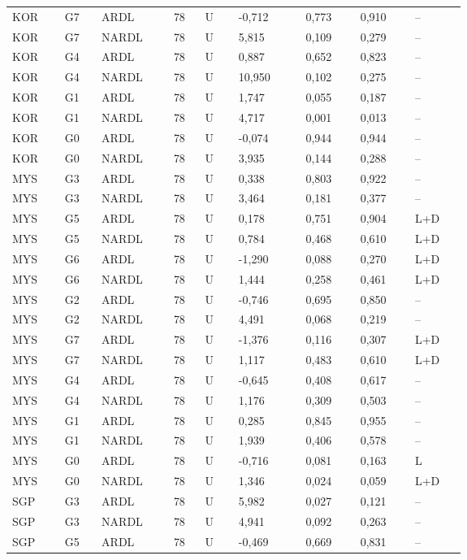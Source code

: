 {\begin{longtable}{p{0.075\linewidth}p{0.05\linewidth}p{0.09\linewidth}p{0.04\linewidth}p{0.05\linewidth}p{0.1\linewidth}p{0.085\linewidth}p{0.085\linewidth}p{0.075\linewidth}}
KOR & G7 & ARDL & 78 & U & -0,712 & 0,773 & 0,910 & --\\
KOR & G7 & NARDL & 78 & U & 5,815 & 0,109 & 0,279 & --\\
KOR & G4 & ARDL & 78 & U & 0,887 & 0,652 & 0,823 & --\\
KOR & G4 & NARDL & 78 & U & 10,950 & 0,102 & 0,275 & --\\
KOR & G1 & ARDL & 78 & U & 1,747 & 0,055 & 0,187 & --\\
KOR & G1 & NARDL & 78 & U & 4,717 & 0,001 & 0,013 & --\\
KOR & G0 & ARDL & 78 & U & -0,074 & 0,944 & 0,944 & --\\
KOR & G0 & NARDL & 78 & U & 3,935 & 0,144 & 0,288 & --\\
MYS & G3 & ARDL & 78 & U & 0,338 & 0,803 & 0,922 & --\\
MYS & G3 & NARDL & 78 & U & 3,464 & 0,181 & 0,377 & --\\
MYS & G5 & ARDL & 78 & U & 0,178 & 0,751 & 0,904 & L+D\\
MYS & G5 & NARDL & 78 & U & 0,784 & 0,468 & 0,610 & L+D\\
MYS & G6 & ARDL & 78 & U & -1,290 & 0,088 & 0,270 & L+D\\
MYS & G6 & NARDL & 78 & U & 1,444 & 0,258 & 0,461 & L+D\\
MYS & G2 & ARDL & 78 & U & -0,746 & 0,695 & 0,850 & --\\
MYS & G2 & NARDL & 78 & U & 4,491 & 0,068 & 0,219 & --\\
MYS & G7 & ARDL & 78 & U & -1,376 & 0,116 & 0,307 & L+D\\
MYS & G7 & NARDL & 78 & U & 1,117 & 0,483 & 0,610 & L+D\\
MYS & G4 & ARDL & 78 & U & -0,645 & 0,408 & 0,617 & --\\
MYS & G4 & NARDL & 78 & U & 1,176 & 0,309 & 0,503 & --\\
MYS & G1 & ARDL & 78 & U & 0,285 & 0,845 & 0,955 & --\\
MYS & G1 & NARDL & 78 & U & 1,939 & 0,406 & 0,578 & --\\
MYS & G0 & ARDL & 78 & U & -0,716 & 0,081 & 0,163 & L\\
MYS & G0 & NARDL & 78 & U & 1,346 & 0,024 & 0,059 & L+D\\
SGP & G3 & ARDL & 78 & U & 5,982 & 0,027 & 0,121 & --\\
SGP & G3 & NARDL & 78 & U & 4,941 & 0,092 & 0,263 & --\\
SGP & G5 & ARDL & 78 & U & -0,469 & 0,669 & 0,831 & --\\

\end{longtable}}
